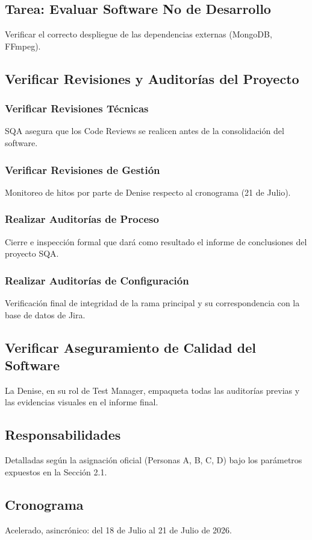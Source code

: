 \documentclass[12pt,a4paper]{article}
\begin{document}
\subsection{Tarea: Evaluar Software No de Desarrollo}
Verificar el correcto despliegue de las dependencias externas (MongoDB, FFmpeg).

\subsection{Verificar Revisiones y Auditorías del Proyecto}
\subsubsection{Verificar Revisiones Técnicas}
SQA asegura que los Code Reviews se realicen antes de la consolidación del software.
\subsubsection{Verificar Revisiones de Gestión}
Monitoreo de hitos por parte de Denise respecto al cronograma (21 de Julio).
\subsubsection{Realizar Auditorías de Proceso}
Cierre e inspección formal que dará como resultado el informe de conclusiones del proyecto SQA.
\subsubsection{Realizar Auditorías de Configuración}
Verificación final de integridad de la rama principal y su correspondencia con la base de datos de Jira.

\subsection{Verificar Aseguramiento de Calidad del Software}
La Denise, en su rol de Test Manager, empaqueta todas las auditorías previas y las evidencias visuales en el informe final.

\subsection{Responsabilidades}
Detalladas según la asignación oficial (Personas A, B, C, D) bajo los parámetros expuestos en la Sección 2.1.

\subsection{Cronograma}
Acelerado, asincrónico: del 18 de Julio al 21 de Julio de 2026.
\end{document}
